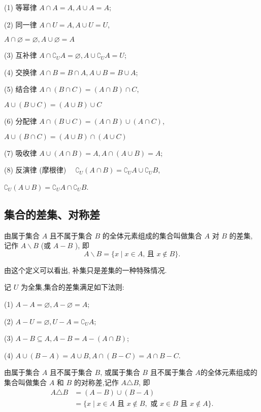 (1) 等幂律 $A \cap A=A, A \cup A=A$;

(2) 同一律 $A \cap U=A, A \cup U=U$,

$A \cap \varnothing=\varnothing, A \cup \varnothing=A$

(3) 互补律 $A \cap \complement_{U} A=\varnothing, A \cup \complement_{U} A=U$;

(4) 交换律 $A \cap B=B \cap A, A \cup B=B \cup A$;

(5) 结合律 $A \cap(B \cap C)=(A \cap B) \cap C$,

$A \cup(B \cup C)=(A \cup B) \cup C$

(6) 分配律 $A \cap(B \cup C)=(A \cap B) \cup(A \cap C)$,

$A \cup(B \cap C)=(A \cup B) \cap(A \cup C)$

(7) 吸收律 $A \cup(A \cap B)=A, A \cap(A \cup B)=A$;

(8) 反演律 (摩根律) $\quad \complement_{U}(A \cap B)=\complement_{U} A \cup \complement_{U} B$,

$\complement_{U}(A \cup B)=\complement_{U} A \cap \complement_{U} B$.

\subsection{集合的差集、对称差}
\begin{definition}
	由属于集合 $A$ 且不属于集合 $B$ 的全体元素组成的集合叫做集合 $A$ 对 $B$ 的差集, 记作 $A \backslash B$ (或 $A-B$ ), 即
	$$
		A \backslash B=\{x \mid x \in A \text {, 且 } x \notin B\} .
	$$
\end{definition}
由这个定义可以看出, 补集只是差集的一种特殊情况.

记 $U$ 为全集,集合的差集满足如下法则:

(1) $A-A=\varnothing, A-\varnothing=A$;

(2) $A-U=\varnothing, U-A=\complement_{U} A$;

(3) $A-B \subseteq A, A-B=A-(A \cap B)$;

(4) $A \cup(B-A)=A \cup B, A \cap(B-C)=A \cap B-C$.

\begin{definition}
	由属于集合 $A$ 且不属于集合 $B$, 或属于集合 $B$ 且不属于集合 $A$的全体元素组成的集合叫做集合 $A$ 和 $B$ 的对称差,记作 $A \triangle B$, 即
	$$
		\begin{aligned}
			A \triangle B & =(A-B) \cup(B-A)                                                                            \\
			              & =\{x \mid x \in A \text { 且 } x \notin B, \text { 或 } x \in B \text { 且 } x \notin A\} .
		\end{aligned}
	$$
\end{definition}

